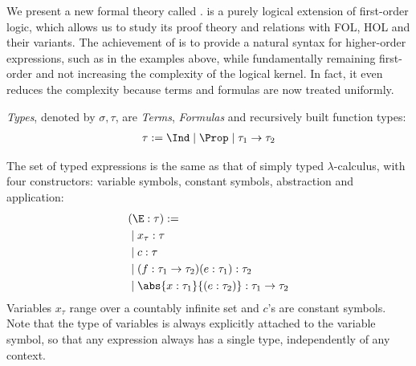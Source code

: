 We present a new formal theory called \lamfol. \lamfol is a purely logical extension of first-order logic, which allows us to study its proof theory and relations with FOL, HOL and their variants.
The achievement of \lamfol is to provide a natural syntax for higher-order expressions, such as in the examples above, while fundamentally remaining first-order and not increasing the complexity of the logical kernel. In fact, it even reduces the complexity because terms and formulas are now treated uniformly.

\begin{definition}[\lamfol]
    \label{def:lamfol}
\textit{Types}, denoted by $\sigma, \tau$, are \textit{Terms}, \textit{Formulas} and recursively built function types:
\begin{align*}
    \tau := \Ind \mid \Prop \mid \tau_1 \to \tau_2 
\end{align*}

The set of typed expressions is the same as that of simply typed $\lambda$-calculus, with four constructors: variable symbols, constant symbols, abstraction and application:
\begin{align*}
    &(\E : \tau) := \\
    & \mid x_\tau: \tau \\
    & \mid c: \tau \\
    & \mid (f: \tau_1 \to \tau_2) (e: \tau_1) : \tau_2 \\
    & \mid \abs{x: \tau_1}{(e: \tau_2)} : \tau_1 \to \tau_2
\end{align*}
Variables $x_\tau$ range over a countably infinite set and $c$'s are constant symbols.
Note that the type of variables is always explicitly attached to the variable symbol, so that any expression always has a single type, independently of any context.


\end{definition}
